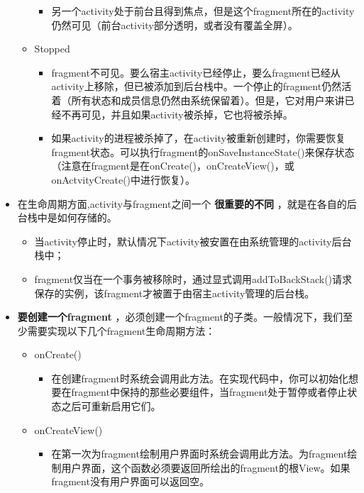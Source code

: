\documentclass[9pt, b5paper]{article}
\begin{document}
\begin{itemize}
\begin{itemize}
\begin{itemize}
\item 另一个activity处于前台且得到焦点，但是这个fragment所在的activity仍然可见（前台activity部分透明，或者没有覆盖全屏）。
\end{itemize}
\item Stopped
\begin{itemize}
\item fragment不可见。要么宿主activity已经停止，要么fragment已经从activity上移除，但已被添加到后台栈中。一个停止的fragment仍然活着（所有状态和成员信息仍然由系统保留着）。但是，它对用户来讲已经不再可见，并且如果activity被杀掉，它也将被杀掉。
\item 如果activity的进程被杀掉了，在activity被重新创建时，你需要恢复fragment状态。可以执行fragment的onSaveInstanceState()来保存状态（注意在fragment是在onCreate()，onCreateView()，或onActvityCreate()中进行恢复）。
\end{itemize}
\end{itemize}
\item 在生命周期方面,activity与fragment之间一个 \textbf{很重要的不同} ，就是在各自的后台栈中是如何存储的。
\begin{itemize}
\item 当activity停止时，默认情况下activity被安置在由系统管理的activity后台栈中；　
\item fragment仅当在一个事务被移除时，通过显式调用addToBackStack()请求保存的实例，该fragment才被置于由宿主activity管理的后台栈。　
\end{itemize}
\item \textbf{要创建一个fragment} ，必须创建一个fragment的子类。一般情况下，我们至少需要实现以下几个fragment生命周期方法：
\begin{itemize}
\item onCreate()
\begin{itemize}
\item 在创建fragment时系统会调用此方法。在实现代码中，你可以初始化想要在fragment中保持的那些必要组件，当fragment处于暂停或者停止状态之后可重新启用它们。
\end{itemize}
\item onCreateView()
\begin{itemize}
\item 在第一次为fragment绘制用户界面时系统会调用此方法。为fragment绘制用户界面，这个函数必须要返回所绘出的fragment的根View。如果fragment没有用户界面可以返回空。
\end{itemize}
\end{itemize}
\begin{verbatim}

\end{verbatim}
\end{itemize}
\end{document}
